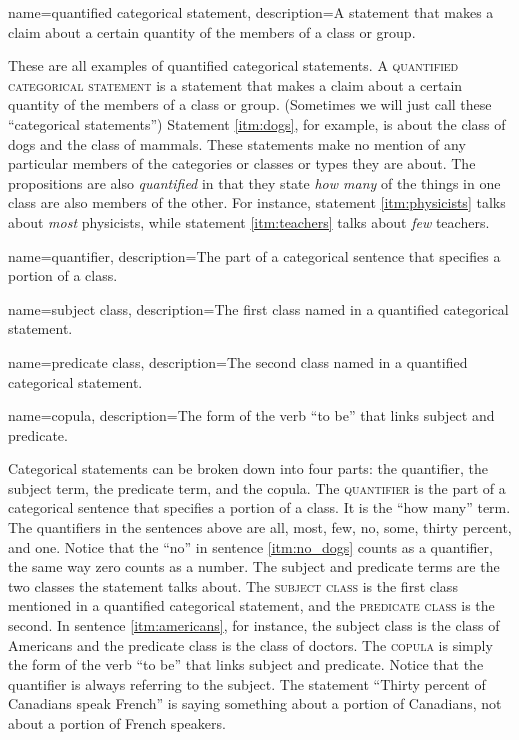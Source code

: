 {
  name=quantified categorical statement,
  description={A statement that makes a claim about a certain quantity of the members of a class or group.}
}

These are all examples of quantified categorical statements. A  \textsc{\gls{quantified categorical statement}} \label{def:quantified_categorical_statement} is a statement that makes a claim about a certain quantity of the members of a class or group. (Sometimes we will just call these ``categorical statements'') Statement \ref{itm:dogs}, for example, is about the class of dogs and the class of mammals. These statements make no mention of any particular members of the categories or classes or types they are about. The propositions are also \textit{quantified} in that they state \textit{how many} of the things in one class are also members of the other. For instance, statement \ref{itm:physicists} talks about \textit{most} physicists, while statement \ref{itm:teachers} talks about \textit{few} teachers.

{
  name=quantifier,
  description={The part of a categorical sentence that specifies a portion of a class.}
}

{
  name=subject class,
  description={The first class named in a quantified categorical statement.}
}

{
  name=predicate class,
  description={The second class named in a quantified categorical statement.}
  }

{
  name=copula,
  description={The form of the verb ``to be'' that links subject and predicate.}
}

Categorical statements can be broken down into four parts: the quantifier, the subject term, the predicate term, and the copula. The \textsc{\gls{quantifier}} \label{def:quantifier} is the part of a categorical sentence that specifies a portion of a class. It is the ``how many'' term. The quantifiers in the sentences above are all, most, few, no, some, thirty percent, and one. Notice that the ``no'' in sentence \ref{itm:no_dogs} counts as a quantifier, the same way zero counts as a number. The subject and predicate terms are the two classes the statement talks about. The \textsc{\gls{subject class}} \label{def:subject_class} is the first class mentioned in a quantified categorical statement, and the \textsc{\gls{predicate class}} \label{def:predicate_class} is the second. In sentence \ref{itm:americans}, for instance, the subject class is the class of Americans and the predicate class is the class of doctors.  The \textsc{\gls{copula}} \label{def:copula} is simply the form of the verb ``to be'' that links subject and predicate. Notice that the quantifier is always referring to the subject. The statement ``Thirty percent of Canadians speak French'' is saying something about a portion of Canadians, not about a portion of French speakers.

